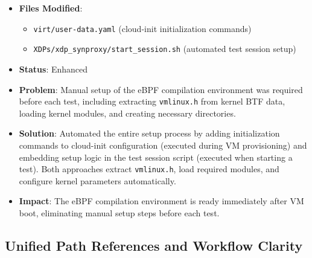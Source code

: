 \begin{itemize}
\item \textbf{Files Modified}:
\begin{itemize}
  \item \texttt{virt/user-data.yaml} (cloud-init initialization commands)
  \item \texttt{XDPs/xdp\_synproxy/start\_session.sh} (automated test session setup)
\end{itemize}

\item \textbf{Status}: Enhanced

\item \textbf{Problem}: Manual setup of the eBPF compilation environment was required before each test, including extracting \texttt{vmlinux.h} from kernel BTF data, loading kernel modules, and creating necessary directories.

\item \textbf{Solution}: Automated the entire setup process by adding initialization commands to cloud-init configuration (executed during VM provisioning) and embedding setup logic in the test session script (executed when starting a test). Both approaches extract \texttt{vmlinux.h}, load required modules, and configure kernel parameters automatically.

\item \textbf{Impact}: The eBPF compilation environment is ready immediately after VM boot, eliminating manual setup steps before each test.
\end{itemize}

\subsection{Unified Path References and Workflow Clarity}

